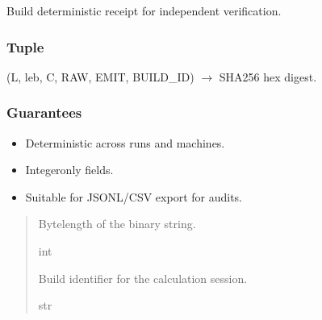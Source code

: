 \documentclass[letterpaper,10pt,english]{sphinxmanual}
\begin{document}
\begin{fulllineitems}
\label{\detokenize{api_reference:clf_calculator.receipt}}
\pysigstartsignatures
\pysiglinewithargsret
{}
{\sphinxparamcomma {}}
{}
\pysigstopsignatures
\sphinxAtStartPar
Build deterministic receipt for independent verification.


\subsubsection{Tuple}
\label{\detokenize{api_reference:tuple}}
\sphinxAtStartPar
(L, leb, C, RAW, EMIT, BUILD\_ID)  \(\rightarrow\) SHA256 hex digest.


\subsubsection{Guarantees}
\label{\detokenize{api_reference:guarantees}}\begin{itemize}
\item {} 
\sphinxAtStartPar
Deterministic across runs and machines.

\item {} 
\sphinxAtStartPar
Integer\sphinxhyphen{}only fields.

\item {} 
\sphinxAtStartPar
Suitable for JSONL/CSV export for audits.

\end{itemize}
\begin{quote}\begin{description}
\sphinxAtStartPar
{}

\sphinxAtStartPar
Byte\sphinxhyphen{}length of the binary string.

\sphinxAtStartPar
int

\sphinxAtStartPar
{}

\sphinxAtStartPar
Build identifier for the calculation session.

\sphinxAtStartPar
str


\end{description}
\end{quote}
\end{fulllineitems}
\end{document}
